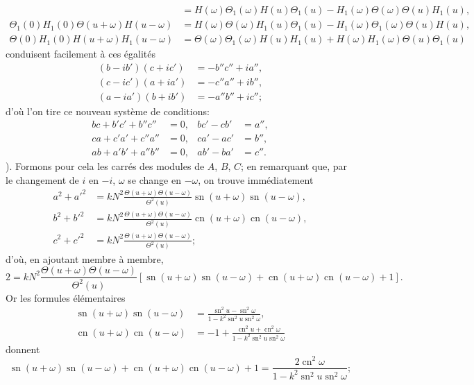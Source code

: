 \documentclass[11pt,leqno,oneside,letterpaper]{book}[2005/09/16]
\DeclareMathOperator{\sn}{sn}
\DeclareMathOperator{\cn}{cn}
\begin{document}
{\begin{align*}
&= H(\omega)\Theta_1(\omega)H(u)\Theta_1(u)
 - H_1(\omega)\Theta(\omega)\Theta(u)H_1(u),
\\
   \Theta_1(0)H_1(0)\Theta(u+\omega)H(u-\omega)
&= H(\omega)\Theta(\omega)H_1(u)\Theta_1(u)
 - H_1(\omega)\Theta_1(\omega)\Theta(u)H(u),
\\
   \Theta(0)H_1(0)H(u+\omega)H_1(u-\omega)
&= \Theta(\omega)\Theta_1(\omega)H(u)H_1(u)
 + H(\omega)H_1(\omega)\Theta(u)\Theta_1(u)
\end{align*}
conduisent facilement \`a ces \'egalit\'es
\begin{align*}
(b-ib')(c + ic') & = -b''c''+ia'',\\
(c-ic')(a + ia') & = -c''a''+ib'',\\
(a-ia')(b + ib') & = -a''b''+ic'';
\end{align*}
d'o\`u l'on tire ce nouveau syst\`eme de conditions:
\begin{align*}
bc+b'c'+b''c'' &= 0, &
bc' - cb' &= a'',\\
ca+c'a'+c''a'' &= 0, &
ca' - ac' &= b'',\\
ab+a'b'+a''b'' &= 0, &
ab' - ba' &= c''.
\end{align*}
}). %
Formons pour cela les carr\'es des modules de $A$, $B$, $C$;
\enlargethispage{1ex}
en remarquant que, par le changement de $i$ en $-i$, $\omega$ se
change en $-\omega$, on trouve imm\'ediatement
\begin{align*}
   a^2 + a'^2
&= kN^2\frac{\Theta(u+\omega)\Theta(u-\omega)}{\Theta^2(u)}
   \sn(u+\omega)\sn(u-\omega),
\\
   b^2 + b'^2
&= kN^2\frac{\Theta(u+\omega)\Theta(u-\omega)}{\Theta^2(u)}
   \cn(u+\omega)\cn(u-\omega),
\\
   c^2 + c'^2
&= kN^2\frac{\Theta(u+\omega)\Theta(u-\omega)}{\Theta^2(u)};
\end{align*}
d'o\`u, en ajoutant membre \`a membre,
\[
  2=
  kN^2 \frac{\Theta(u+\omega) \Theta(u-\omega)}{\Theta^2(u)}
  [\sn(u+\omega)\sn(u-\omega) + \cn(u+\omega)\cn(u-\omega) + 1].
\]
Or les formules \'el\'ementaires
\begin{align*}
  \sn(u+\omega)\sn(u-\omega) &=
  \frac{\sn^2 u - \sn^2 \omega}{1-k^2\sn^2 u\sn^2 \omega},\\
  \cn(u+\omega)\cn(u-\omega) &=
  -1+\frac{\cn^2 u + \cn^2 \omega}{1-k^2\sn^2 u\sn^2 \omega}
\end{align*}
donnent
\[
  \sn(u+\omega)\sn(u-\omega) + \cn(u+\omega)\cn(u-\omega) + 1
  = \frac{2\cn^2 \omega}{1-k^2 \sn^2 u \sn^2 \omega};
\]
\end{document}
